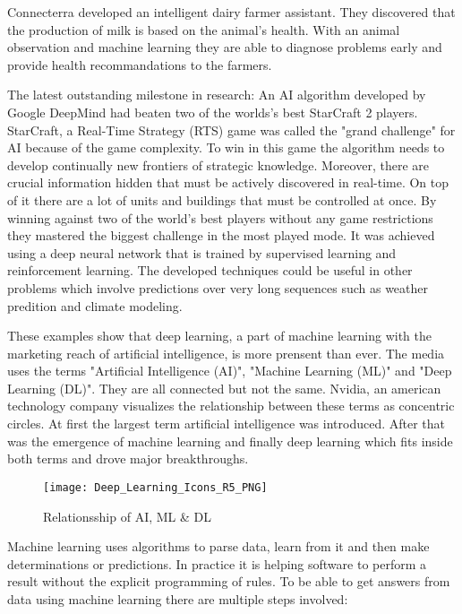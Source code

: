 Connecterra developed an intelligent dairy farmer assistant.
They discovered that the production of milk is based on the animal’s health.
With an animal observation and machine learning they are able to diagnose problems early and provide health recommandations to the farmers.
\cite{tensorflow-stories, connecterra-video, connecterra-web}

The latest outstanding milestone in research: An AI algorithm developed by Google DeepMind had beaten two of the worlds's best StarCraft 2 players.
StarCraft, a Real-Time Strategy (RTS) game was called the "grand challenge" for AI because of the game complexity.
To win in this game the algorithm needs to develop continually new frontiers of strategic knowledge.
Moreover, there are crucial information hidden that must be actively discovered in real-time. On top of it there are a lot of units and buildings that must be controlled at once.
By winning against two of the world's best players without any game restrictions they mastered the biggest challenge in the most played mode.
It was achieved using a deep neural network that is trained by supervised learning and reinforcement learning.
The developed techniques could be useful in other problems which involve predictions over very long sequences such as weather predition and climate modeling.
\cite{alphastar}

These examples show that deep learning, a part of machine learning with the marketing reach of artificial intelligence, is more prensent than ever.
The media uses the terms "Artificial Intelligence (AI)", "Machine Learning (ML)" and "Deep Learning (DL)". They are all connected but not the same.
\hfill \break
Nvidia, an american technology company visualizes the relationship between these terms as concentric circles.
At first the largest term artificial intelligence was introduced.
After that was the emergence of machine learning and finally deep learning which fits inside both terms and drove major breakthroughs.
\cite{nvidia-ai-explained}

\begin{figure}[H]
    \centering
    \texttt{[image: Deep\_Learning\_Icons\_R5\_PNG]}
    \caption{\cite[page 5]{nvidia-ai-explained} Relationsship of AI, ML \& DL}
    \label{fig:ai_ml_dl_termns}
\end{figure}

Machine learning uses algorithms to parse data, learn from it and then make determinations or predictions.
In practice it is helping software to perform a result without the explicit programming of rules.
To be able to get answers from data using machine learning there are multiple steps involved:
\cite{nvidia-ai-explained, tensorflow-about}

